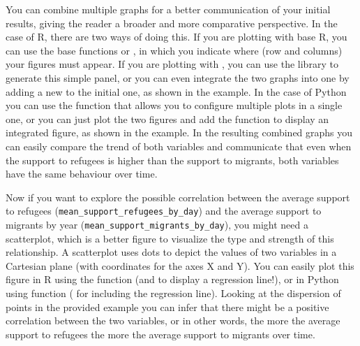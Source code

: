 
You can combine multiple graphs for a better communication of your initial results, giving the reader a broader and more comparative perspective. In the case of R, there are two ways of doing this. If you are plotting with base R, you can use the base functions  or , in which you indicate where (row and columns) your figures must appear. If you are plotting with , you can use the library  to generate this simple panel, or you can even integrate the two graphs into one by adding a new  to the initial one, as shown in the example. In the case of Python you can use the  function  that allows you to configure multiple plots in a single one, or you can just plot the two figures and add the 	 function  to display an integrated figure, as shown in the example.  In the resulting combined graphs you can easily compare the trend of both variables and communicate that even when the support to refugees is higher than the support to migrants, both variables have the same behaviour over time.


Now if you want to explore the possible correlation between the average support to refugees (\texttt{mean\_support\_refugees\_by\_day}) and the average support to migrants by year (\texttt{mean\_support\_migrants\_by\_day}), you might need a scatterplot, which is a better figure to visualize the type and strength of this relationship. A scatterplot uses dots to depict the values of two variables in a Cartesian plane (with coordinates for the axes X and Y). You can easily plot this figure in R using the  function  (and  to display a regression line!), or in Python using  function  ( for including the regression line). Looking at the dispersion of points in the provided example you can infer that there might be a positive correlation between the two variables, or in other words, the more the average support to refugees the more the average support to migrants over time.


